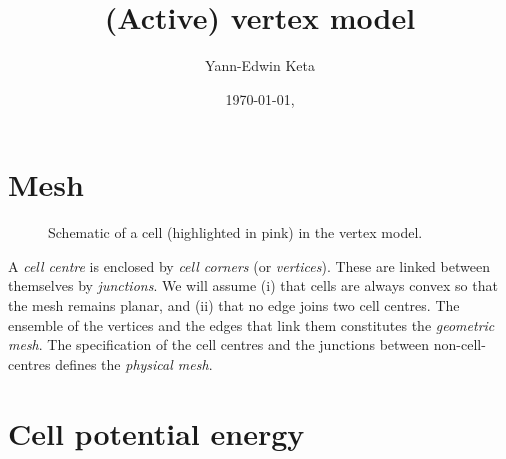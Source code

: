 \documentclass[aps, superscriptaddress, notitlepage]{revtex4-1}
\def\scale{0.8}
\begin{document}

\title{(Active) vertex model}
\author{Yann-Edwin Keta}
\date{\today, \currenttime}
\maketitle


\section{Mesh}

\begin{figure}[H]
\centering
\begin{tikzpicture}[scale=0.75*\scale]

\end{tikzpicture}
\caption{Schematic of a cell (highlighted in pink) in the vertex model.}
\label{fig:schematic}
\end{figure}

A \textit{cell centre} is enclosed by \textit{cell corners} (or \textit{vertices}). These are linked between themselves by \textit{junctions}. We will assume (i) that cells are always convex so that the mesh remains planar, and (ii) that no edge joins two cell centres. The ensemble of the vertices and the edges that link them constitutes the \textit{geometric mesh}. The specification of the cell centres and the junctions between non-cell-centres defines the \textit{physical mesh}.

\section{Cell potential energy}
\end{document}
